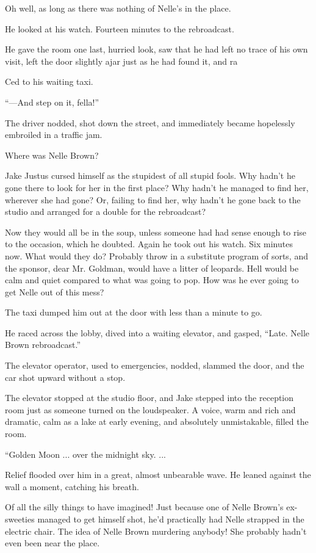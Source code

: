 \documentclass{novel}
\begin{document}
Oh well, as long as there was nothing of Nelle's in the place.

He looked at his watch. Fourteen minutes to the rebroadcast.

He gave the room one last, hurried look, saw that he had left no trace of his own visit, left the door slightly ajar just as he had found it, and ra

Ced to his waiting taxi.

“—And step on it, fella!”

The driver nodded, shot down the street, and immediately became hopelessly embroiled in a traffic jam.

Where was Nelle Brown?

Jake Justus cursed himself as the stupidest of all stupid fools. Why hadn’t he gone there to look for her in the first place? Why hadn’t he managed to find her, wherever she had gone? Or, failing to find her, why hadn’t he gone back to the studio and arranged for a double for the rebroadcast?

Now they would all be in the soup, unless someone had had sense enough to rise to the occasion, which he doubted. Again he took out his watch. Six minutes now. What would they do? Probably throw in a substitute program of sorts, and the sponsor, dear Mr. Goldman, would have a litter of leopards. Hell would be calm and quiet compared to what was going to pop. How was he ever going to get Nelle out of this mess?

The taxi dumped him out at the door with less than a minute to go.

He raced across the lobby, dived into a waiting elevator, and gasped, “Late. Nelle Brown rebroadcast.”

The elevator operator, used to emergencies, nodded, slammed the door, and the car shot upward without a stop.

The elevator stopped at the studio floor, and Jake stepped into the reception room just as someone turned on the loudspeaker. A voice, warm and rich and dramatic, calm as a lake at early evening, and absolutely unmistakable, filled the room.

“Golden Moon ... over the midnight sky. ...

Relief flooded over him in a great, almost unbearable wave. He leaned against the wall a moment, catching his breath.

Of all the silly things to have imagined! Just because one of Nelle Brown’s ex-sweeties managed to get himself shot, he’d practically had Nelle strapped in the electric chair. The idea of Nelle Brown murdering anybody! She probably hadn’t even been near the place.
\end{document}
